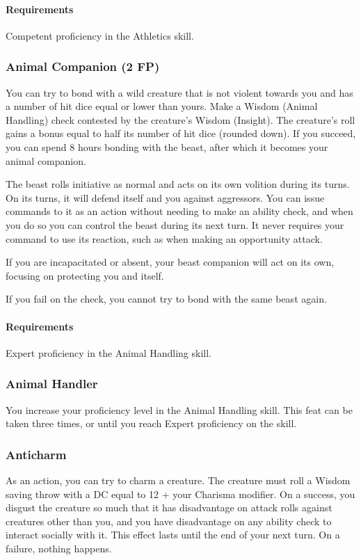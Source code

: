     \paragraph{Requirements} Competent proficiency in the Athletics skill.
\subsubsection{Animal Companion (2 FP)} \label{feat::animalcompanion}
    You can try to bond with a wild creature that is not violent towards you and has a number of hit dice equal or lower than yours.
    Make a Wisdom (Animal Handling) check contested by the creature's Wisdom (Insight).
    The creature's roll gains a bonus equal to half its number of hit dice (rounded down).
    If you succeed, you can spend 8 hours bonding with the beast, after which it becomes your animal companion.

    The beast rolls initiative as normal and acts on its own volition during its turns.
    On its turns, it will defend itself and you against aggressors.
    You can issue commands to it as an action without needing to make an ability check, and when you do so you can control the beast during its next turn.
    It never requires your command to use its reaction, such as when making an opportunity attack.

    If you are incapacitated or absent, your beast companion will act on its own, focusing on protecting you and itself.

    If you fail on the check, you cannot try to bond with the same beast again.
    \paragraph{Requirements} Expert proficiency in the Animal Handling skill.
\subsubsection{Animal Handler} \label{feat::animalhandler}
    You increase your proficiency level in the Animal Handling skill.
    This feat can be taken three times, or until you reach Expert proficiency on the skill.
\subsubsection{Anticharm} \label{feat::anticharm}
    As an action, you can try to charm a creature.
    The creature must roll a Wisdom saving throw with a DC equal to 12 + your Charisma modifier.
    On a success, you disgust the creature so much that it has disadvantage on attack rolls against creatures other than you, and you have disadvantage on any ability check to interact socially with it.
    This effect lasts until the end of your next turn.
    On a failure, nothing happens.

